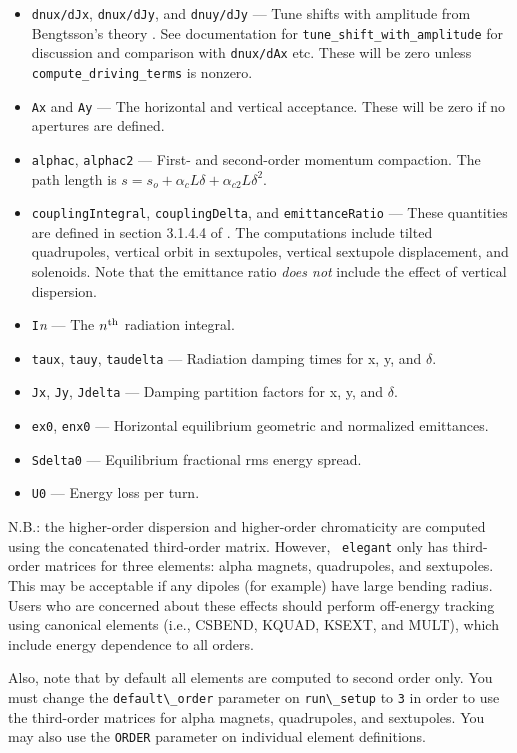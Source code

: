 \documentclass[11pt]{article}
\begin{document}
\begin{itemize}
\item {\tt dnux/dJx}, {\tt dnux/dJy},  and {\tt dnuy/dJy} --- Tune shifts with amplitude from Bengtsson's theory \cite{Bengtsson}.
 See documentation for \verb|tune_shift_with_amplitude| for discussion and comparison with {\tt dnux/dAx} etc.
 These will be zero unless \verb|compute_driving_terms| is nonzero.
\item {\tt Ax} and {\tt Ay} --- The horizontal and vertical acceptance.  These will be zero if no apertures are
  defined.
\item {\tt alphac}, {\tt alphac2} --- First- and second-order momentum compaction.  The path length is 
  $s = s_o + \alpha_c L \delta + \alpha_{c2} L \delta^2$.
\item {\tt couplingIntegral}, {\tt couplingDelta}, and {\tt emittanceRatio} --- These quantities are defined
  in section 3.1.4.4 of \cite{HAPE}.  The computations include tilted quadrupoles, vertical orbit in sextupoles,
  vertical sextupole displacement, and solenoids.  Note that the emittance ratio {\em does not} include 
  the effect of vertical dispersion.
\item {\tt I}{\em n} --- The $n^{\rm th}$ radiation integral.
\item {\tt taux}, {\tt tauy}, {\tt taudelta} --- Radiation damping times for x, y, and $\delta$.
\item {\tt Jx}, {\tt Jy}, {\tt Jdelta} --- Damping partition factors for  x, y, and $\delta$.
\item {\tt ex0}, {\tt enx0} --- Horizontal equilibrium geometric and normalized emittances.
\item {\tt Sdelta0} --- Equilibrium fractional rms energy spread.
\item {\tt U0} --- Energy loss per turn.
\end{itemize}

N.B.: the higher-order dispersion and higher-order chromaticity are
computed using the concatenated third-order matrix.  However, {\tt
elegant} only has third-order matrices for three elements:
alpha magnets, quadrupoles, and sextupoles.  This may be acceptable if
any dipoles (for example) have large bending radius.  Users who are
concerned about these effects should perform off-energy tracking using
canonical elements (i.e., CSBEND, KQUAD, KSEXT, and MULT), which
include energy dependence to all orders.

Also, note that by default all elements are computed to second order
only.  You must change the \verb|default\_order| parameter on
\verb|run\_setup| to \verb|3| in order to use the third-order matrices
for alpha magnets, quadrupoles, and sextupoles.  You may also use the
{\tt ORDER} parameter on individual element definitions.
\end{document}
